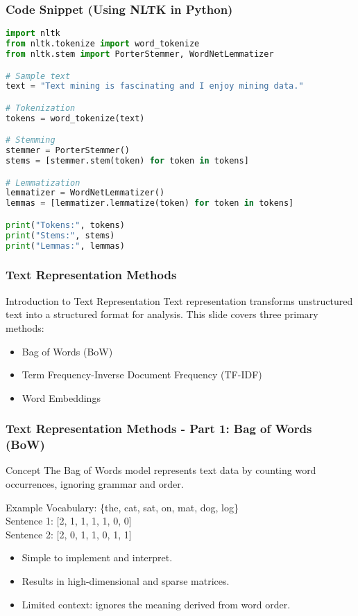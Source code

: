 \documentclass[aspectratio=169]{beamer}
\begin{document}
\begin{frame}[fragile]
    \frametitle{Code Snippet (Using NLTK in Python)}
    \begin{lstlisting}[language=Python]
import nltk
from nltk.tokenize import word_tokenize
from nltk.stem import PorterStemmer, WordNetLemmatizer

# Sample text
text = "Text mining is fascinating and I enjoy mining data."

# Tokenization
tokens = word_tokenize(text)

# Stemming
stemmer = PorterStemmer()
stems = [stemmer.stem(token) for token in tokens]

# Lemmatization
lemmatizer = WordNetLemmatizer()
lemmas = [lemmatizer.lemmatize(token) for token in tokens]

print("Tokens:", tokens)
print("Stems:", stems)
print("Lemmas:", lemmas)
    \end{lstlisting}
\end{frame}

\begin{frame}[fragile]
    \frametitle{Text Representation Methods}
    \begin{block}{Introduction to Text Representation}
        Text representation transforms unstructured text into a structured format for analysis. This slide covers three primary methods:
        \begin{itemize}
            \item Bag of Words (BoW)
            \item Term Frequency-Inverse Document Frequency (TF-IDF)
            \item Word Embeddings
        \end{itemize}
    \end{block}
\end{frame}

\begin{frame}[fragile]
    \frametitle{Text Representation Methods - Part 1: Bag of Words (BoW)}
    \begin{block}{Concept}
        The Bag of Words model represents text data by counting word occurrences, ignoring grammar and order.
    \end{block}

    \begin{block}{Example}
        Vocabulary: \{the, cat, sat, on, mat, dog, log\} \\
        Sentence 1: [2, 1, 1, 1, 1, 0, 0] \\
        Sentence 2: [2, 0, 1, 1, 0, 1, 1]
    \end{block}

    \begin{itemize}
        \item Simple to implement and interpret.
        \item Results in high-dimensional and sparse matrices.
        \item Limited context: ignores the meaning derived from word order.
    \end{itemize}
\end{frame}
\end{document}
